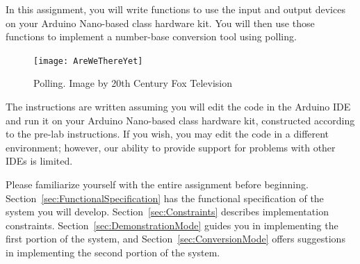 

\usepackage{graphicx}
\usepackage{addfont}
\usepackage{wrapfig}
\usepackage{multicol}

\renewcommand{\labnumber}{9}
\renewcommand{\labname}{Using Polling with Memory-Mapped Input/Output}
\renewcommand{\shortlabname}{memory-mapped i/o -- pollinglab}
\renewcommand{\collaborationrules}{\individualeffort}
\renewcommand{\duedate}{Before the start of your lab section on November 10, 15, or 16}
\newcommand{\nano}{Arduino Nano}
\renewcommand{\runtimeenvironment}{your \nano-based class hardware kit}


\startdocument

In this assignment, you will write functions to use the input and output
devices on \runtimeenvironment. You will then use those functions to implement
a number-base conversion tool using polling.

\begin{figure}[h]
    \centering
    \texttt{[image: AreWeThereYet]}
    \caption{Polling. \tiny Image by 20th Century Fox Television}
\end{figure}

The instructions are written assuming you will edit the code in the Arduino IDE
and run it on \runtimeenvironment, constructed according to the pre-lab
instructions. If you wish, you may edit the code in a different environment;
however, our ability to provide support for problems with other IDEs is limited.

Please familiarize yourself with the entire assignment before beginning.
Section~\ref{sec:FunctionalSpecification} has the functional specification of
the system you will develop. Section~\ref{sec:Constraints} describes
implementation constraints. Section~\ref{sec:DemonstrationMode} guides you in
implementing the first portion of the system, and
Section~\ref{sec:ConversionMode} offers suggestions in implementing the second
portion of the system.

